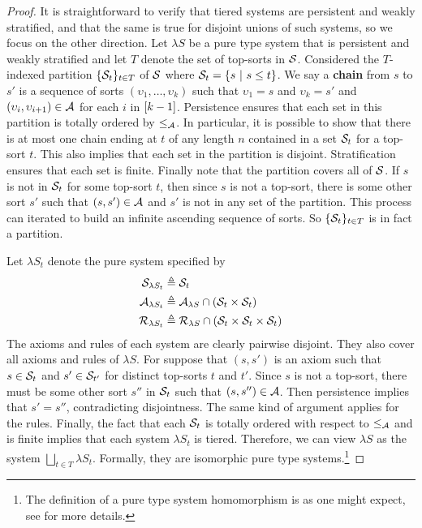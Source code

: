 \documentclass{article}
\begin{document}
\begin{proof}
It is straightforward to verify that tiered systems are persistent and weakly stratified, and that the same is true for disjoint unions of such systems, so we focus on the other direction.
Let $\lambda S$ be a pure type system that is persistent and weakly stratified and let $T$ denote the set of top-sorts in $\mathcal S$.
Considered the $T$-indexed partition $\{\mathcal S_t\}_{t \in T}$ of $\mathcal S$ where $\mathcal S_t = \{s \ | \ s \leq t\}$.
We say a \textbf{chain} from $s$ to $s'$ is a sequence of sorts $(\upsilon_1, \dots, \upsilon_k)$ such that $\upsilon_1 = s$ and $\upsilon_k = s'$ and $(\upsilon_i, \upsilon_{i + 1}) \in \mathcal A$ for each $i$ in $[k - 1]$.
Persistence ensures that each set in this partition is totally ordered by $\leq_\mathcal A$.
In particular, it is possible to show that there is at most one chain ending at $t$ of any length $n$ contained in a set $\mathcal S_t$ for a top-sort $t$.
This also implies that each set in the partition is disjoint.
Stratification ensures that each set is finite.
Finally note that the partition covers all of $\mathcal S$.
If $s$ is not in $\mathcal S_t$ for some top-sort $t$, then since $s$ is not a top-sort, there is some other sort $s'$ such that $(s, s') \in \mathcal A$ and $s'$ is not in any set of the partition. This process can iterated to build an infinite ascending sequence of sorts.
So $\{\mathcal S_t\}_{t \in T}$ is in fact a partition.

Let $\lambda S_t$ denote the pure system specified by
\begin{align*}
\mathcal S_{\lambda S_t} &\triangleq \mathcal S_t \\
\mathcal A_{\lambda S_t} &\triangleq \mathcal A_{\lambda S} \cap (\mathcal S_t \times \mathcal S_t) \\
\mathcal R_{\lambda S_t} &\triangleq \mathcal R_{\lambda S} \cap (\mathcal S_t \times \mathcal S_t \times \mathcal S_t)
\end{align*}
The axioms and rules of each system are clearly pairwise disjoint.
They also cover all axioms and rules of $\lambda S$.
For suppose that $(s, s')$ is an axiom such that $s \in \mathcal S_t$ and $s' \in \mathcal S_{t'}$ for distinct top-sorts $t$ and $t'$.
Since $s$ is not a top-sort, there must be some other sort $s''$ in $\mathcal S_t$ such that $(s, s'') \in \mathcal A$.
Then persistence implies that $s' = s''$, contradicting disjointness.
The same kind of argument applies for the rules.
Finally, the fact that each $\mathcal S_t$ is totally ordered with respect to $\leq_\mathcal A$ and is finite implies that each system $\lambda S_t$ is tiered.
Therefore, we can view $\lambda S$ as the system $\bigsqcup_{t \in T} \lambda S_t$.
Formally, they are isomorphic pure type systems.\footnote{The definition of a pure type system homomorphism is as one might expect, see \cite{roux-doorn-2014} for more details.}
\end{proof}
\end{document}
